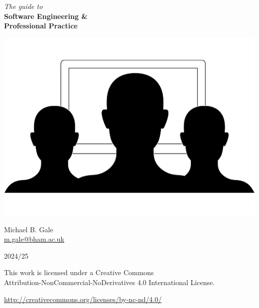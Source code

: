
\begin{titlepage}
	\begin{center}

{\Huge \textit{The guide to}} \\[0.2cm]
{\Huge \textbf{Software Engineering \&\\ Professional Practice}} \\[0.2cm]

\vfill

\includegraphics[scale=0.53]{logo-bw.pdf}

\vfill

{\LARGE Michael B. Gale} \\[0.1cm]
{\large \href{mailto:m.gale@bham.ac.uk}{m.gale@bham.ac.uk}}

\vspace{1cm}

{\Large 2024/25}
\end{center}
\end{titlepage}

\phantom{~}
\vfill

\ccbyncnd

\vspace*{0.2cm}

This work is licensed under a Creative Commons\\
Attribution-NonCommercial-NoDerivatives 4.0 International License.

\vspace*{0.2cm}

\url{http://creativecommons.org/licenses/by-nc-nd/4.0/}
